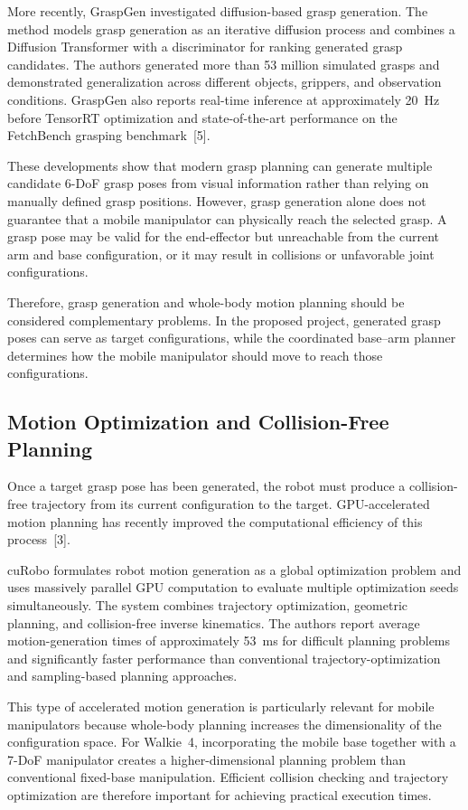 \documentclass[12pt,a4paper]{article}
\begin{document}
More recently, GraspGen investigated diffusion-based grasp generation. The method
models grasp generation as an iterative diffusion process and combines a Diffusion Transformer
with a discriminator for ranking generated grasp candidates. The authors generated more than
53 million simulated grasps and demonstrated generalization across different objects, grippers,
and observation conditions. GraspGen also reports real-time inference at approximately 20~Hz
before TensorRT optimization and state-of-the-art performance on the FetchBench grasping
benchmark~[5].

These developments show that modern grasp planning can generate multiple candidate
6-DoF grasp poses from visual information rather than relying on manually defined grasp
positions. However, grasp generation alone does not guarantee that a mobile manipulator can
physically reach the selected grasp. A grasp pose may be valid for the end-effector but
unreachable from the current arm and base configuration, or it may result in collisions or
unfavorable joint configurations.

Therefore, grasp generation and whole-body motion planning should be considered
complementary problems. In the proposed project, generated grasp poses can serve as target
configurations, while the coordinated base--arm planner determines how the mobile
manipulator should move to reach those configurations.

\subsection*{Motion Optimization and Collision-Free Planning}

Once a target grasp pose has been generated, the robot must produce a collision-free
trajectory from its current configuration to the target. GPU-accelerated motion planning has
recently improved the computational efficiency of this process~[3].

cuRobo formulates robot motion generation as a global optimization problem and uses
massively parallel GPU computation to evaluate multiple optimization seeds simultaneously.
The system combines trajectory optimization, geometric planning, and collision-free inverse
kinematics. The authors report average motion-generation times of approximately 53~ms for
difficult planning problems and significantly faster performance than conventional
trajectory-optimization and sampling-based planning approaches.

This type of accelerated motion generation is particularly relevant for mobile
manipulators because whole-body planning increases the dimensionality of the configuration
space. For Walkie~4, incorporating the mobile base together with a 7-DoF manipulator creates a
higher-dimensional planning problem than conventional fixed-base manipulation. Efficient
collision checking and trajectory optimization are therefore important for achieving practical
execution times.
\end{document}
